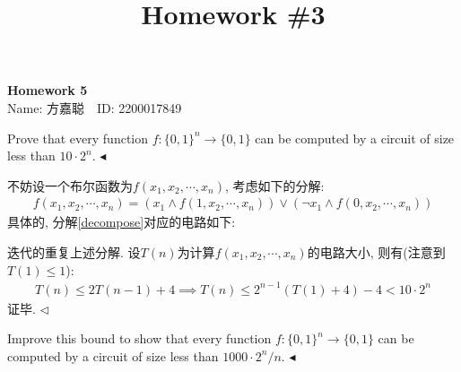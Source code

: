 \documentclass[11pt]{article}
\title{Homework \#3}
\newcommand{\1}{\mathbf{1}}
\newenvironment{problem}[2][Problem]{\begin{trivlist}
\item[\hskip \labelsep{\bfseries#1}\hskip\labelsep{\bfseries#2.}]}{\hfill$\blacktriangleleft$\end{trivlist}}
\newenvironment{answer}[1][Answer]{\begin{trivlist}
\item[\hskip \labelsep{\bfseries\itshape#1.}\hskip \labelsep]}{\hfill$\lhd$\end{trivlist}}
\begin{document}
\kaishu

\pagestyle{fancy}
\chead{}

\begin{center}
    {\LARGE \bf Homework 5}\\
    {Name: 方嘉聪\ \  ID: 2200017849}            %
\end{center}

\begin{problem}{1(16 points)}
    Prove that every function $f: \{0,1\}^n \rightarrow \{0,1\}$ can be computed by a circuit of size less than $10\cdot 2^n$.
\end{problem}
\begin{answer}
    不妨设一个布尔函数为$f(x_1,x_2,\cdots,x_n)$, 考虑如下的分解:
    \begin{align}
        \label{decompose}
        f(x_1, x_2,\cdots,x_n) = (x_1 \land f(1, x_2, \cdots, x_n)) \lor (\neg x_1 \land f(0, x_2, \cdots, x_n))
    \end{align}
    具体的, 分解\eqref{decompose}对应的电路如下:
    \begin{center}
    \end{center}
    迭代的重复上述分解. 设$T(n)$为计算$f(x_1, x_2,\cdots,x_n)$的电路大小, 则有(注意到$T(1) \le 1$):
    \begin{align*}
        T(n) \leq 2T(n-1) + 4 \implies T(n) \le 2^{n-1}(T(1) + 4) - 4 < 10 \cdot 2^n
    \end{align*}
    证毕. 
\end{answer}
\begin{problem}{2(21 points)}
    Improve this bound to show that every function $f: \{0,1\}^n \rightarrow \{0,1\}$ can be computed by a circuit of size less than $1000\cdot 2^n/n$.
\end{problem}
\end{document}
